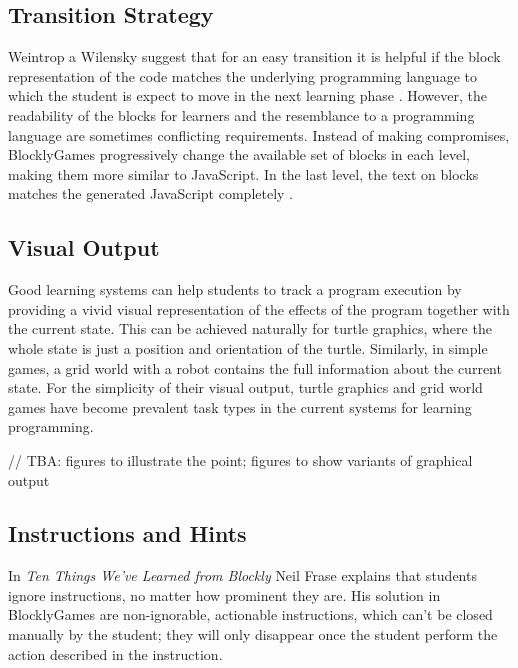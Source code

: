 \documentclass[
    digital,
    color,
    11pt,
    nocover,
    table,  %
    nolof,  %
    nolot,  %
    microtype,
]{fithesis3}
\begin{document}
\subsection{Transition Strategy}
\label{sec:transition-strategy}
Weintrop a Wilensky suggest that for an easy transition
  it is helpful if the block representation of the code
  matches the underlying programming language
  to which the student is expect to move in the next learning phase
  \cite{challenges-of-blocks-based-environments}.
However, the readability of the blocks for learners
  and the resemblance to a programming language
  are sometimes conflicting requirements.
Instead of making compromises,
  BlocklyGames progressively change the available set of blocks in each level,
  making them more similar to JavaScript.
In the last level,
  the text on blocks matches the generated JavaScript completely
  \cite{blockly-10-things}.


\subsection{Visual Output}
\label{sec:visual-output}

Good learning systems can help students to track a program execution
  by providing a vivid visual representation of the effects of the program
  together with the current state.
This can be achieved naturally for turtle graphics,
  where the whole state is just a position and orientation of the turtle.
Similarly, in simple games, a grid world with a robot
  contains the full information about the current state.
For the simplicity of their visual output,
  turtle graphics and grid world games have become prevalent task types
  in the current systems for learning programming.

// TBA: figures to illustrate the point; figures to show variants of graphical output


\subsection{Instructions and Hints}
\label{sec:instructions-and-hints}

In \emph{Ten Things We’ve Learned from Blockly} \cite{blockly-10-things}
  Neil Frase explains that students ignore instructions,
  no matter how prominent they are.
His solution in BlocklyGames are non-ignorable, actionable instructions,
  which can’t be closed manually by the student;
  they will only disappear once the student perform the action described in the instruction.
\end{document}
